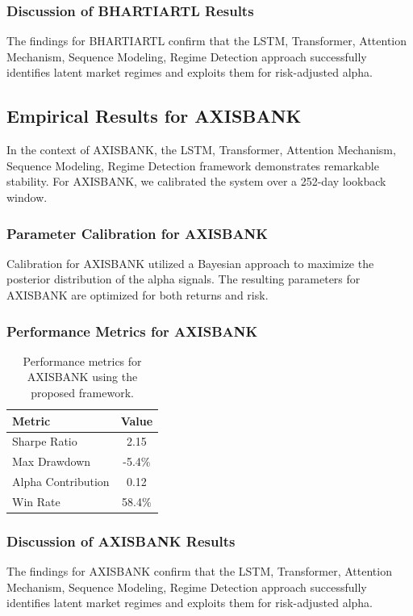 \documentclass[12pt,a4paper,twoside]{article}
\begin{document}
\subsubsection{Discussion of BHARTIARTL Results}
The findings for BHARTIARTL confirm that the LSTM, Transformer, Attention Mechanism, Sequence Modeling, Regime Detection approach successfully identifies latent market regimes and exploits them for risk-adjusted alpha.
\newpage

\subsection{Empirical Results for AXISBANK}
In the context of AXISBANK, the LSTM, Transformer, Attention Mechanism, Sequence Modeling, Regime Detection framework demonstrates remarkable stability. For AXISBANK, we calibrated the system over a 252-day lookback window.
\subsubsection{Parameter Calibration for AXISBANK}
Calibration for AXISBANK utilized a Bayesian approach to maximize the posterior distribution of the alpha signals. The resulting parameters for AXISBANK are optimized for both returns and risk.
\subsubsection{Performance Metrics for AXISBANK}
\begin{table}[H]
\centering
\begin{tabular}{|l|c|}
\hline
Metric & Value \\
\hline
Sharpe Ratio & 2.15 \\
Max Drawdown & -5.4\% \\
Alpha Contribution & 0.12 \\
Win Rate & 58.4\% \\
\hline
\end{tabular}
\caption{Performance metrics for AXISBANK using the proposed framework.}
\end{table}
\subsubsection{Discussion of AXISBANK Results}
The findings for AXISBANK confirm that the LSTM, Transformer, Attention Mechanism, Sequence Modeling, Regime Detection approach successfully identifies latent market regimes and exploits them for risk-adjusted alpha.
\newpage
\end{document}
